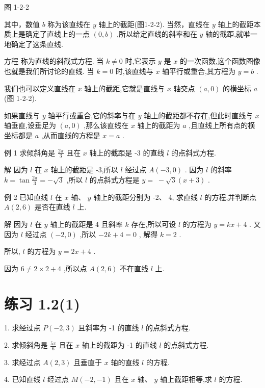 \documentclass[10pt]{article}
\newcommand*\circled[1]{\tikz[baseline=(char.base)]{\node[shape=circle,draw,inner sep=1.5pt] (char) {\small #1};}}
\begin{document}
图 1-2-2

其中，数值 \(b\) 称为该直线在 \(y\) 轴上的截距(图1-2-2). 当然，直线在 \(y\) 轴上的截距本质上是确定了直线上的一点 \(\left( {0,b}\right)\) ,所以给定直线的斜率和在 \(y\) 轴的截距,就唯一地确定了这条直线.

方程 \circled{2} 称为直线的斜截式方程. 当 \(k \neq  0\) 时,它表示 \(y\) 是 \(x\) 的一次函数,这个函数图像也就是我们所讨论的直线. 当 \(k = 0\) 时,该直线与 \(x\) 轴平行或重合,其方程为 \(y = b\) .

我们也可以定义直线在 \(x\) 轴上的截距,它就是直线与 \(x\) 轴交点 \(\left( {a,0}\right)\) 的横坐标 \(a\) (图 1-2-2).

如果直线与 \(y\) 轴平行或重合,它的斜率与在 \(y\) 轴上的截距都不存在,但此时直线与 \(x\) 轴垂直,设垂足为 \(\left( {a,0}\right)\) ,那么该直线在 \(x\) 轴上的截距为 \(a\) ,且直线上所有点的横坐标都是 \(a\) ,从而直线的方程是 \(x = a\) .

例 1 求倾斜角是 \(\frac{2\pi }{3}\) 且在 \(x\) 轴上的截距是 -3 的直线 \(l\) 的点斜式方程.

解 因为 \(l\) 在 \(x\) 轴上的截距是 -3,所以 \(l\) 经过点 \(A\left( {-3,0}\right)\) . 因为 \(l\) 的斜率 \(k = \tan \frac{2\pi }{3} =  - \sqrt{3}\) ,所以 \(l\) 的点斜式方程是 \(y = \; - \sqrt{3}\left( {x + 3}\right)\) .

例 2 已知直线 \(l\) 在 \(x\) 轴、 \(y\) 轴上的截距分别为 -2、 4, 求直线 \(l\) 的方程,并判断点 \(A\left( {2,6}\right)\) 是否在直线 \(l\) 上.

解 因为 \(l\) 在 \(y\) 轴上的截距是 4 且斜率 \(k\) 存在,所以可设 \(l\) 的方程为 \(y = {kx} + 4\) . 又因为 \(l\) 经过点 \(\left( {-2,0}\right)\) ,所以 \(- {2k} + 4 = 0\) , 解得 \(k = 2\) .

所以, \(l\) 的方程为 \(y = {2x} + 4\) .

因为 \(6 \neq  2 \times  2 + 4\) ,所以点 \(A\left( {2,6}\right)\) 不在直线 \(l\) 上.

\section*{练习 1.2(1)}

1. 求经过点 \(P\left( {-2,3}\right)\) 且斜率为 -1 的直线 \(l\) 的点斜式方程.

2. 求倾斜角是 \(\frac{5\pi }{6}\) 且在 \(x\) 轴上的截距为 -1 的直线 \(l\) 的点斜式方程.

3. 求经过点 \(A\left( {2,3}\right)\) 且垂直于 \(x\) 轴的直线 \(l\) 的方程.

4. 已知直线 \(l\) 经过点 \(M\left( {-2, - 1}\right)\) 且在 \(x\) 轴、 \(y\) 轴上截距相等,求 \(l\) 的方程.
\end{document}
